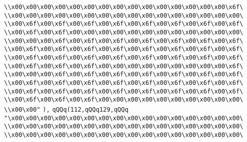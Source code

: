 \verb|\\x00\x00\x00\x00\x00\x00\x00\x00\x00\x00\x00\x00\x00\x00\x00\x6f\|\newline
\verb|\\x00\x00\x00\x00\x00\x00\x00\x00\x00\x00\x00\x00\x00\x00\x00\x00\|\newline
\verb|\\x00\x6f\x00\x6f\x00\x6f\x00\x6f\x00\x6f\x00\x6f\x00\x6f\x00\x6f\|\newline
\verb|\\x00\x6f\x00\x6f\x00\x00\x00\x00\x00\x00\x00\x00\x00\x00\x00\x00\|\newline
\verb|\\x00\x00\x00\x6f\x00\x6f\x00\x6f\x00\x6f\x00\x6f\x00\x6f\x00\x6f\|\newline
\verb|\\x00\x6f\x00\x6f\x00\x6f\x00\x6f\x00\x6f\x00\x6f\x00\x6f\x00\x6f\|\newline
\verb|\\x00\x6f\x00\x6f\x00\x6f\x00\x6f\x00\x6f\x00\x6f\x00\x6f\x00\x6f\|\newline
\verb|\\x00\x6f\x00\x6f\x00\x6f\x00\x00\x00\x00\x00\x00\x00\x00\x00\x6f\|\newline
\verb|\\x00\x00\x00\x6f\x00\x6f\x00\x6f\x00\x6f\x00\x6f\x00\x6f\x00\x6f\|\newline
\verb|\\x00\x6f\x00\x6f\x00\x6f\x00\x6f\x00\x6f\x00\x6f\x00\x6f\x00\x6f\|\newline
\verb|\\x00\x6f\x00\x6f\x00\x6f\x00\x6f\x00\x6f\x00\x6f\x00\x6f\x00\x6f\|\newline
\verb|\\x00\x6f\x00\x6f\x00\x6f\x00\x00\x00\x00\x00\x00\x00\x00\x00\x00\|\newline
\verb|\\x00\x00"|\newline
\verb|),|\newline
\verb|qQQq(112,qQQq129,qQQq|\newline
\verb|"\x00\x00\x00\x00\x00\x00\x00\x00\x00\x00\x00\x00\x00\x00\x00\x00\|\newline
\verb|\\x00\x00\x00\x00\x00\x00\x00\x00\x00\x00\x00\x00\x00\x00\x00\x00\|\newline
\verb|\\x00\x00\x00\x00\x00\x00\x00\x00\x00\x00\x00\x00\x00\x00\x00\x00\|\newline
